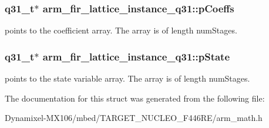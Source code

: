 \subsubsection[{\texorpdfstring{p\+Coeffs}{pCoeffs}}]{\setlength{\rightskip}{0pt plus 5cm}q31\+\_\+t$\ast$ arm\+\_\+fir\+\_\+lattice\+\_\+instance\+\_\+q31\+::p\+Coeffs}\hypertarget{structarm__fir__lattice__instance__q31_a66c3364bf5863cd45e05f1652c3dc522}{}\label{structarm__fir__lattice__instance__q31_a66c3364bf5863cd45e05f1652c3dc522}
points to the coefficient array. The array is of length num\+Stages. 
\subsubsection[{\texorpdfstring{p\+State}{pState}}]{\setlength{\rightskip}{0pt plus 5cm}q31\+\_\+t$\ast$ arm\+\_\+fir\+\_\+lattice\+\_\+instance\+\_\+q31\+::p\+State}\hypertarget{structarm__fir__lattice__instance__q31_a08fe9494ab7cd336b791e9657adadcf6}{}\label{structarm__fir__lattice__instance__q31_a08fe9494ab7cd336b791e9657adadcf6}
points to the state variable array. The array is of length num\+Stages. 

The documentation for this struct was generated from the following file\+:\begin{DoxyCompactItemize}
\item 
Dynamixel-\/\+M\+X106/mbed/\+T\+A\+R\+G\+E\+T\+\_\+\+N\+U\+C\+L\+E\+O\+\_\+\+F446\+R\+E/arm\+\_\+math.\+h\end{DoxyCompactItemize}
